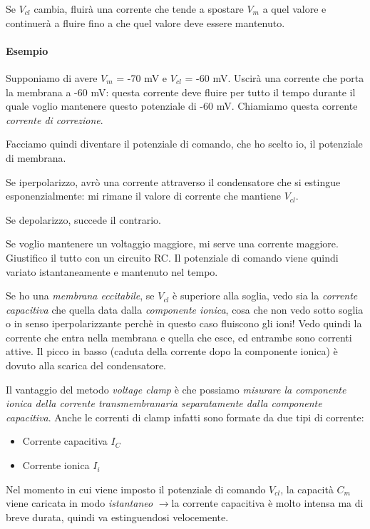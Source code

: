 \documentclass[a4paper,12pt]{article}
\newcommand{\lfreccia}{\ensuremath{\longrightarrow}}
\begin{document}
Se $V_{cl}$ cambia, fluirà una corrente che tende a spostare $V_{m}$ a quel valore e continuerà a fluire fino a che quel valore deve essere mantenuto. 

\paragraph{Esempio}
Supponiamo di avere $V_{m}$ = -70 mV e $V_{cl}$ = -60 mV. Uscirà una corrente che porta la membrana a -60 mV: questa corrente deve fluire per tutto il tempo durante il quale voglio mantenere questo potenziale di -60 mV. Chiamiamo questa corrente \emph{corrente di correzione}.

Facciamo quindi diventare il potenziale di comando, che ho scelto io, il potenziale di membrana.

Se iperpolarizzo, avrò una corrente attraverso il condensatore che si estingue esponenzialmente: mi rimane il valore di corrente che mantiene $V_{cl}$.

Se depolarizzo, succede il contrario.

Se voglio mantenere un voltaggio maggiore, mi serve una corrente maggiore. Giustifico il tutto con un circuito RC. Il potenziale di comando viene quindi variato istantaneamente e mantenuto nel tempo.

Se ho una \emph{membrana eccitabile}, se $V_{cl}$  è superiore alla soglia, vedo sia la \emph{corrente capacitiva} che quella data dalla \emph{componente ionica}, cosa che non vedo sotto soglia o in senso iperpolarizzante perchè in questo caso fluiscono gli ioni! Vedo quindi la corrente che entra nella membrana e quella che esce, ed entrambe sono correnti attive. Il picco in basso (caduta della corrente dopo la componente ionica) è dovuto alla scarica del condensatore.

Il vantaggio del metodo \emph{voltage clamp} è che possiamo \emph{misurare la componente ionica della corrente transmembranaria separatamente dalla componente capacitiva}. Anche le correnti di clamp infatti sono formate da due tipi di corrente:
\begin{itemize}
\item{Corrente capacitiva $I_{C}$}
\item{Corrente ionica $I_{i}$}
\end{itemize}

Nel momento in cui viene imposto il potenziale di comando $V_{cl}$, la capacità $C_{m}$ viene caricata in modo \emph{istantaneo} \lfreccia la corrente capacitiva è molto intensa ma di breve durata, quindi va estinguendosi velocemente.
\end{document}
